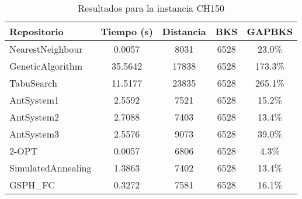 \begin{table}[H]
\centering
\caption{Resultados para la instancia CH150}
\begin{tabular}{|l|c|c|c|c|}
\hline
\textbf{Repositorio} & \textbf{Tiempo (s)} & \textbf{Distancia} & \textbf{BKS} & \textbf{GAPBKS} \\ 
\hline
NearestNeighbour & 0.0057 & 8031 & 6528 & 23.0\% \\ 
GeneticAlgorithm & 35.5642 & 17838 & 6528 & 173.3\% \\ 
TabuSearch & 11.5177 & 23835 & 6528 & 265.1\% \\ 
AntSystem1 & 2.5592 & 7521 & 6528 & 15.2\% \\ 
AntSystem2 & 2.7088 & 7403 & 6528 & 13.4\% \\ 
AntSystem3 & 2.5576 & 9073 & 6528 & 39.0\% \\ 
2-OPT & 0.0057 & 6806 & 6528 & 4.3\% \\ 
SimulatedAnnealing & 1.3863 & 7402 & 6528 & 13.4\% \\ 
GSPH_FC & 0.3272 & 7581 & 6528 & 16.1\% \\ 
\hline
\end{tabular}
\end{table}
